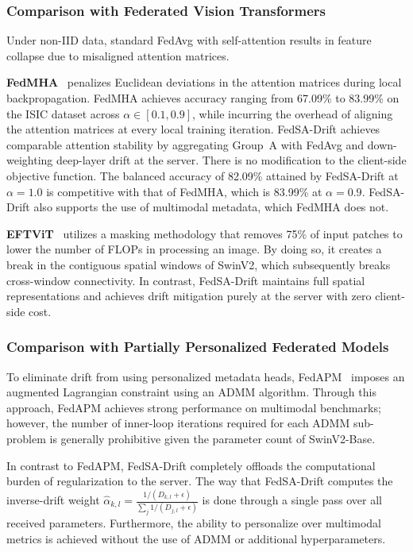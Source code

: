\documentclass{ieeeaccess}
\newcommand{\sadrift}{FedSA-Drift}
\begin{document}
\subsubsection{Comparison with Federated Vision Transformers}

Under non-IID data, standard FedAvg with self-attention results in feature collapse due to misaligned attention matrices.

\textbf{FedMHA}~\cite{Darzi2024} penalizes Euclidean deviations in the attention matrices during local backpropagation. FedMHA achieves accuracy ranging from 67.09\% to 83.99\% on the ISIC dataset across $\alpha \in [0.1, 0.9]$, while incurring the overhead of aligning the attention matrices at every local training iteration. \sadrift{} achieves comparable attention stability by aggregating Group~A with FedAvg and down-weighting deep-layer drift at the server. There is no modification to the client-side objective function. The balanced accuracy of 82.09\% attained by \sadrift{} at $\alpha = 1.0$ is competitive with that of FedMHA, which is 83.99\% at $\alpha = 0.9$. \sadrift{} also supports the use of multimodal metadata, which FedMHA does not.

\textbf{EFTViT}~\cite{Wu2024} utilizes a masking methodology that removes 75\% of input patches to lower the number of FLOPs in processing an image. By doing so, it creates a break in the contiguous spatial windows of SwinV2, which subsequently breaks cross-window connectivity. In contrast, \sadrift{} maintains full spatial representations and achieves drift mitigation purely at the server with zero client-side cost.

\subsubsection{Comparison with Partially Personalized Federated Models}

To eliminate drift from using personalized metadata heads, FedAPM~\cite{Zhu2025} imposes an augmented Lagrangian constraint using an ADMM algorithm. Through this approach, FedAPM achieves strong performance on multimodal benchmarks; however, the number of inner-loop iterations required for each ADMM sub-problem is generally prohibitive given the parameter count of SwinV2-Base.

In contrast to FedAPM, \sadrift{} completely offloads the computational burden of regularization to the server. The way that \sadrift{} computes the inverse-drift weight $\hat{\alpha}_{k,l} = \frac{1/(D_{k,l} + \epsilon)}{\sum_j 1/(D_{j,l} + \epsilon)}$ is done through a single pass over all received parameters. Furthermore, the ability to personalize over multimodal metrics is achieved without the use of ADMM or additional hyperparameters.
\end{document}
